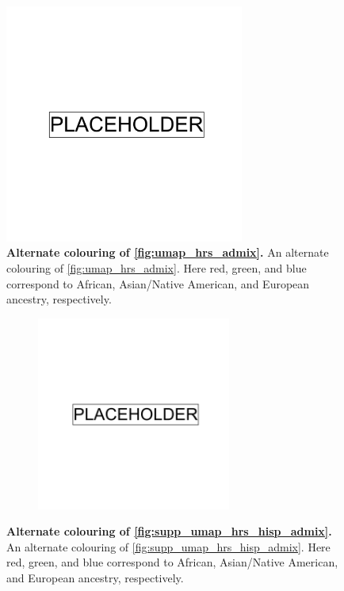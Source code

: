 \begin{figure}
\centering
    \includegraphics[width=0.7\textwidth]{placeholder.png}
   \caption[Alternate colouring of \ref{fig:umap_hrs_admix}]{\textbf{Alternate colouring of \ref{fig:umap_hrs_admix}.} An alternate colouring of \ref{fig:umap_hrs_admix}. Here red, green, and blue correspond to African, Asian/Native American, and European ancestry, respectively.}
    \label{fig:umap_hrs_admix_alt}
\end{figure}

\newpage

\begin{figure}[ht]
    \centering
    \begin{subfigure}{\textwidth}
    \includegraphics[width=0.7\textwidth]{placeholder.png}
    \end{subfigure}
    \caption[An alternate colouring of \ref{fig:supp_umap_hrs_hisp_admix}]{\textbf{Alternate colouring of \ref{fig:supp_umap_hrs_hisp_admix}.} An alternate colouring of \ref{fig:supp_umap_hrs_hisp_admix}. Here red, green, and blue correspond to African, Asian/Native American, and European ancestry, respectively.}
    \label{fig:supp_umap_hrs_hisp_admix_alt}
\end{figure}

